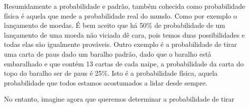 Resumidamente a probabilidade e padrão, também cohecida como probabilidade física é aquela que mede a probabilidade real do mundo. Como por exemplo o lançamento de moedas. É bem aceito que há 50\% de probabilidade de um lançamento de uma moeda não viciada dê cara, pois temos duas possibilidades e todas elas são igualmente prováveis. Outro exemplo é a probabilidade de tirar uma carta de paus dado um baralho padrão, dado que o baralho está embaralhado e que contém 13 cartas de cada naipe, a probabilidade da carta do topo do baralho ser de paus é 25\%. Isto é a probabilidade física, aquela probabilidade que todos estamos acostumados a lidar desde sempre.

No entanto, imagine agora que queremos determinar a probabilidade de tirar 
